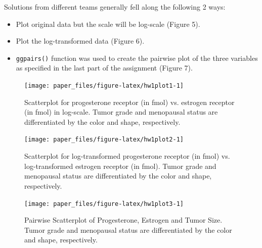 Solutions from different teams generally fell along the following 2
ways:

\begin{itemize}
\item
  Plot original data but the scale will be log-scale (Figure 5).
\item
  Plot the log-transformed data (Figure 6).
\item
  \texttt{ggpairs()} function was used to create the pairwise plot of
  the three variables as specified in the last part of the assignment
  (Figure 7).
\end{itemize}

\begin{Schunk}
\begin{figure}[h]

{\centering \texttt{[image: paper\_files/figure-latex/hw1plot1-1]} 

}

\caption[Scatterplot for progesterone receptor (in fmol) vs]{Scatterplot for progesterone receptor (in fmol) vs. estrogen receptor (in fmol) in log-scale. Tumor grade and menopausal status are differentiated by the color and shape, respectively.}\label{fig:hw1plot1}
\end{figure}
\end{Schunk}

\begin{Schunk}
\begin{figure}[h]

{\centering \texttt{[image: paper\_files/figure-latex/hw1plot2-1]} 

}

\caption[Scatterplot for log-transformed progesterone receptor (in fmol) vs]{Scatterplot for log-transformed progesterone receptor (in fmol) vs. log-transformed estrogen receptor (in fmol). Tumor grade and menopausal status are differentiated by the color and shape, respectively.}\label{fig:hw1plot2}
\end{figure}
\end{Schunk}

\begin{Schunk}
\begin{figure}[h]

{\centering \texttt{[image: paper\_files/figure-latex/hw1plot3-1]} 

}

\caption[Pairwise Scatterplot of Progesterone, Estrogen and Tumor Size]{Pairwise Scatterplot of Progesterone, Estrogen and Tumor Size. Tumor grade and menopausal status are differentiated by the color and shape, respectively.}\label{fig:hw1plot3}
\end{figure}
\end{Schunk}

